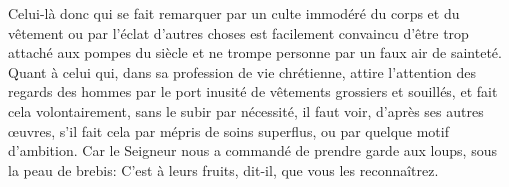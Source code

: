 Celui-là donc qui se fait remarquer
	par un culte immodéré du corps et du vêtement
	ou par l’éclat d’autres choses
	est facilement convaincu d’être trop attaché aux pompes du siècle
	et ne trompe personne par un faux air de sainteté.
Quant à celui qui, dans sa profession de vie chrétienne,
	attire l’attention des regards des hommes
		par le port inusité de vêtements grossiers et souillés,
	et fait cela volontairement, sans le subir par nécessité,
	il faut voir, d’après ses autres œuvres,
	s’il fait cela par mépris de soins superflus,
		ou par quelque motif d’ambition.
Car le Seigneur nous a commandé de prendre garde aux loups,
		sous la peau de brebis:
	C’est à leurs fruits, dit-il, que vous les reconnaîtrez.
